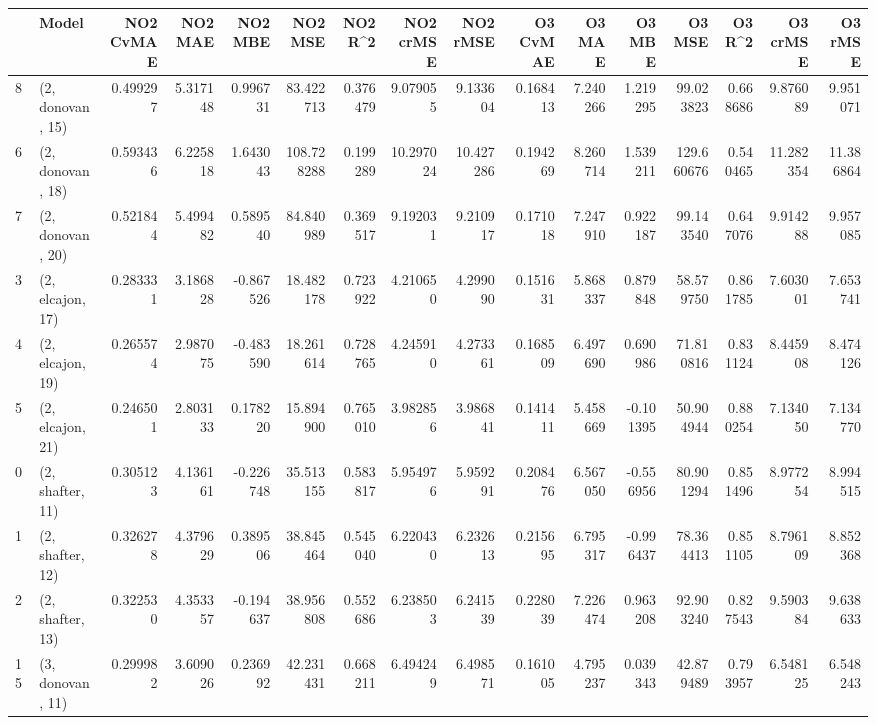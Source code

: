 \begin{tabular}{llrrrrrrrrrrrrrr}
\toprule
{} &             Model &  NO2 CvMAE &   NO2 MAE &   NO2 MBE &     NO2 MSE &   NO2 R\textasciicircum2 &  NO2 crMSE &   NO2 rMSE &  O3 CvMAE &    O3 MAE &    O3 MBE &      O3 MSE &    O3 R\textasciicircum2 &   O3 crMSE &    O3 rMSE \\
\midrule
8  &  (2, donovan, 15) &   0.499297 &  5.317148 &  0.996731 &   83.422713 &  0.376479 &   9.079055 &   9.133604 &  0.168413 &  7.240266 &  1.219295 &   99.023823 &  0.668686 &   9.876089 &   9.951071 \\
6  &  (2, donovan, 18) &   0.593436 &  6.225818 &  1.643043 &  108.728288 &  0.199289 &  10.297024 &  10.427286 &  0.194269 &  8.260714 &  1.539211 &  129.660676 &  0.540465 &  11.282354 &  11.386864 \\
7  &  (2, donovan, 20) &   0.521844 &  5.499482 &  0.589540 &   84.840989 &  0.369517 &   9.192031 &   9.210917 &  0.171018 &  7.247910 &  0.922187 &   99.143540 &  0.647076 &   9.914288 &   9.957085 \\
3  &  (2, elcajon, 17) &   0.283331 &  3.186828 & -0.867526 &   18.482178 &  0.723922 &   4.210650 &   4.299090 &  0.151631 &  5.868337 &  0.879848 &   58.579750 &  0.861785 &   7.603001 &   7.653741 \\
4  &  (2, elcajon, 19) &   0.265574 &  2.987075 & -0.483590 &   18.261614 &  0.728765 &   4.245910 &   4.273361 &  0.168509 &  6.497690 &  0.690986 &   71.810816 &  0.831124 &   8.445908 &   8.474126 \\
5  &  (2, elcajon, 21) &   0.246501 &  2.803133 &  0.178220 &   15.894900 &  0.765010 &   3.982856 &   3.986841 &  0.141411 &  5.458669 & -0.101395 &   50.904944 &  0.880254 &   7.134050 &   7.134770 \\
0  &  (2, shafter, 11) &   0.305123 &  4.136161 & -0.226748 &   35.513155 &  0.583817 &   5.954976 &   5.959291 &  0.208476 &  6.567050 & -0.556956 &   80.901294 &  0.851496 &   8.977254 &   8.994515 \\
1  &  (2, shafter, 12) &   0.326278 &  4.379629 &  0.389506 &   38.845464 &  0.545040 &   6.220430 &   6.232613 &  0.215695 &  6.795317 & -0.996437 &   78.364413 &  0.851105 &   8.796109 &   8.852368 \\
2  &  (2, shafter, 13) &   0.322530 &  4.353357 & -0.194637 &   38.956808 &  0.552686 &   6.238503 &   6.241539 &  0.228039 &  7.226474 &  0.963208 &   92.903240 &  0.827543 &   9.590384 &   9.638633 \\
15 &  (3, donovan, 11) &   0.299982 &  3.609026 &  0.236992 &   42.231431 &  0.668211 &   6.494249 &   6.498571 &  0.161005 &  4.795237 &  0.039343 &   42.879489 &  0.793957 &   6.548125 &   6.548243 \\

\end{tabular}
